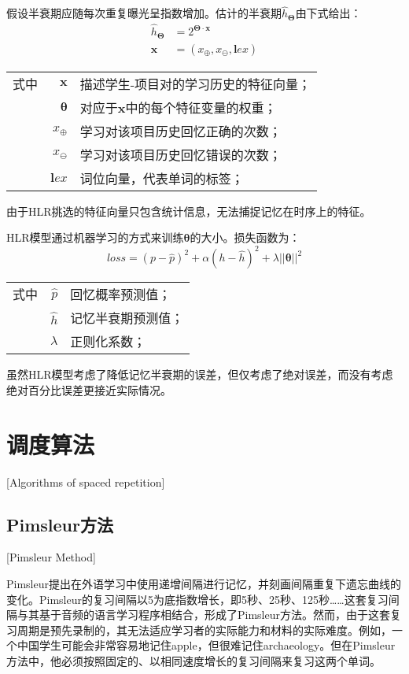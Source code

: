 假设半衰期应随每次重复曝光呈指数增加。估计的半衰期$\hat{h}_{\bm\Theta}$由下式给出：
\begin{equation}
\begin{align}
\hat{h}_{\bm\Theta}&=2^{\bm\Theta \cdot \bm x}\\
\bm x &= (x_\mathrm{\oplus},x_\mathrm{\ominus}, \bm lex)
\end{align}
\end{equation}
\begin{tabularx}{\textwidth}{@{}l@{\quad}r@{———}X@{}}
    式中& $\bm x$ &描述学生-项目对的学习历史的特征向量；\\
    & $\bm \theta$ &对应于$\bm x$中的每个特征变量的权重；\\
    & $x_\mathrm{\oplus}$ &学习对该项目历史回忆正确的次数；\\
    & $x_\mathrm{\ominus}$ &学习对该项目历史回忆错误的次数；\\
    & $\bm lex$ &词位向量，代表单词的标签；
\end{tabularx}\vspace{3.15bp}

由于HLR挑选的特征向量只包含统计信息，无法捕捉记忆在时序上的特征。

HLR模型通过机器学习的方式来训练$\bm \theta$的大小。损失函数为：
\begin{equation}
\label{eqn:hlr:loss}
loss=(p-\hat p)^2 + \alpha(h-\hat h)^2 + \lambda||\bm\theta||^2
\end{equation}
\begin{tabularx}{\textwidth}{@{}l@{\quad}r@{———}X@{}}
    式中& $\hat p$ &回忆概率预测值；\\
    & $\hat h$ &记忆半衰期预测值；\\
    & $\lambda$ &正则化系数；
\end{tabularx}\vspace{3.15bp}

虽然HLR模型考虑了降低记忆半衰期的误差，但仅考虑了绝对误差，而没有考虑绝对百分比误差更接近实际情况。

\section{调度算法}[Algorithms of spaced repetition]

\subsection{Pimsleur方法}[Pimsleur Method]\label{sec:pimsleur}

Pimsleur提出在外语学习中使用递增间隔进行记忆，并刻画间隔重复下遗忘曲线的变化\cite{pimsleurMemorySchedule1967}。Pimsleur的复习间隔以5为底指数增长，即5秒、25秒、125秒……这套复习间隔与其基于音频的语言学习程序相结合，形成了Pimsleur方法。然而，由于这套复习周期是预先录制的，其无法适应学习者的实际能力和材料的实际难度。例如，一个中国学生可能会非常容易地记住apple，但很难记住archaeology。但在Pimsleur方法中，他必须按照固定的、以相同速度增长的复习间隔来复习这两个单词。

